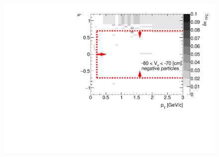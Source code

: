 \begin{figure}[H]
{		\includegraphics[width=\linewidth,page=15]{graphics/systematicsEfficiency/deadMaterial/secondaries_Unbinned_Charged_SDCD.pdf}\\
	}%
\end{figure}

